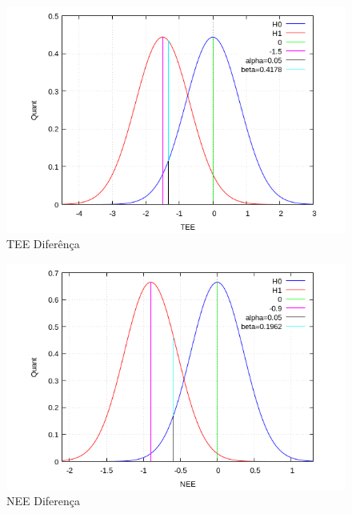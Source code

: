 \begin{minipage}[!b]{0.45\linewidth}
	\begin{figure}[H]
		\centering
		\includegraphics[scale=0.4]{./image/ESTAT/TEE_DIFF.png}
		\caption{TEE Diferênça}
		\label{TEEDIFF}
	\end{figure}
\end{minipage}
\hspace{1cm}
\begin{minipage}[!b]{0.45\linewidth}
	\begin{figure}[H]
		\centering
		\includegraphics[scale=0.4]{./image/ESTAT/NEE_DIFF.png}
		\caption{NEE Diferença}
		\label{NEEDIFF}
	\end{figure}
\end{minipage}
\newline
